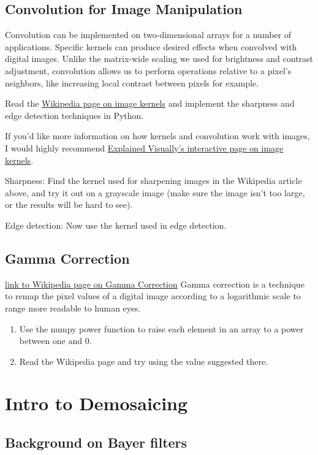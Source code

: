 \documentclass{tufte-handout}
\begin{document}
\subsection{Convolution for Image Manipulation}

Convolution can be implemented on two-dimensional arrays for a number of applications. Specific kernels can produce desired effects when convolved with digital images. Unlike the matrix-wide scaling we used for brightness and contrast adjustment, convolution allows us to perform operations relative to a pixel's neighbors, like increasing local contrast between pixels for example.

Read the \href{https://en.wikipedia.org/wiki/Kernel_(image_processing)}{Wikipedia page on image kernels} and implement the sharpness and edge detection techniques in Python.

If you'd like more information on how kernels and convolution work with images, I would highly recommend \href{http://setosa.io/ev/image-kernels/}{Explained Visually's interactive page on image kernels}.

\bex
\item Sharpness:
Find the kernel used for sharpening images in the Wikipedia article above, and try it out on a grayscale image (make sure the image isn't too large, or the results will be hard to see).
\item Edge detection: Now use the kernel used in edge detection.
\eex

\subsection{Gamma Correction}  %
\href{https://en.wikipedia.org/wiki/Gamma_correction}{link to Wikipedia page on Gamma Correction}
Gamma correction is a technique to remap the pixel values of a digital image according to a logarithmic scale to range more readable to human eyes.
\begin{enumerate}
    \item Use the numpy power function to raise each element in an array to a power between one and 0.
    \item Read the Wikipedia page and try using the value suggested there.
\end{enumerate}
\section{Intro to Demosaicing}
\subsection{Background on Bayer filters}  %
\end{document}
